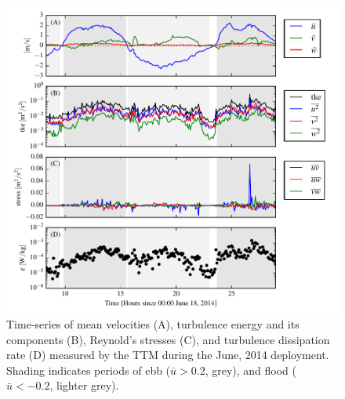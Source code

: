 \documentclass[twocol]{ametsoc}
\begin{document}

\begin{figure}[t]
  \centering
  \includegraphics{TurbTime_TTM_01}
  \caption{Time-series of mean velocities (A), turbulence energy and its components (B), Reynold's stresses (C), and turbulence dissipation rate (D) measured by the TTM during the June, 2014 deployment. Shading indicates periods of ebb ($\bar{u}>0.2$, grey), and flood ($\bar{u}<-0.2$, lighter grey).}
  \label{fig:turbtime:ttm}
\end{figure}
\end{document}
